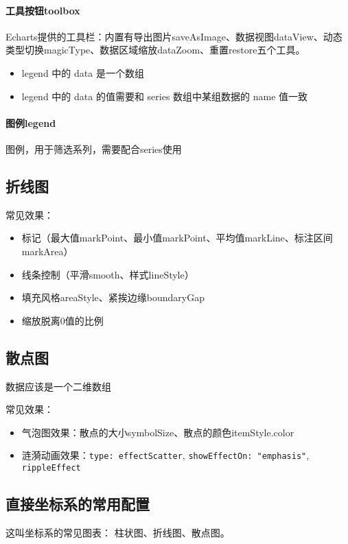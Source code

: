 \paragraph{工具按钮toolbox} Echarts提供的工具栏：内置有导出图片saveAsImage、数据视图dataView、动态类型切换magicType、数据区域缩放dataZoom、重置restore五个工具。

\begin{itemize}
    \item legend 中的 data 是一个数组
    \item legend 中的 data 的值需要和 series 数组中某组数据的 name 值一致
\end{itemize}
\paragraph{图例legend} 图例，用于筛选系列，需要配合series使用

\subsection{折线图}
常见效果：
\begin{itemize}
    \item 标记（最大值markPoint、最小值markPoint、平均值markLine、标注区间markArea）
    \item 线条控制（平滑smooth、样式lineStyle）
    \item 填充风格areaStyle、紧挨边缘boundaryGap
    \item 缩放脱离0值的比例
\end{itemize}

\subsection{散点图}
数据应该是一个二维数组

常见效果：
\begin{itemize}
    \item 气泡图效果：散点的大小symbolSize、散点的颜色itemStyle.color
    \item 涟漪动画效果：\verb|type: effectScatter|, \verb|showEffectOn: "emphasis"|, \verb|rippleEffect|
\end{itemize}
\subsection{直接坐标系的常用配置}
这叫坐标系的常见图表： 柱状图、折线图、散点图。

